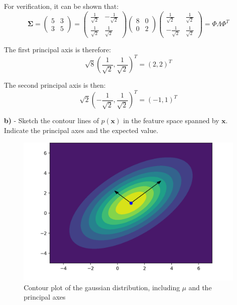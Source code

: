 \documentclass{homeworg}
\begin{document}
For verification, it can be shown that:
\begin{equation}
    \bm{\Sigma}
    =
    \begin{pmatrix}
        5&3 \\ 
        3&5
    \end{pmatrix}
    =
    \begin{pmatrix}
        \frac{1}{\sqrt{2}} & -\frac{1}{\sqrt{2}} \\
        \frac{1}{\sqrt{2}} & \frac{1}{\sqrt{2}}
    \end{pmatrix}
    \begin{pmatrix}
        8&0 \\ 
        0&2
    \end{pmatrix}
    \begin{pmatrix}
        \frac{1}{\sqrt{2}} & \frac{1}{\sqrt{2}} \\
        -\frac{1}{\sqrt{2}} & \frac{1}{\sqrt{2}}
    \end{pmatrix}
    =
    \Phi\Lambda\Phi^T
\end{equation}

The first principal axis is therefore:
\begin{equation}
    \sqrt{8}\left(\frac{1}{\sqrt{2}}, \frac{1}{\sqrt{2}}\right)^T = (2, 2)^T
\end{equation}

The second principal axis is then:
\begin{equation}
    \sqrt{2}\left(-\frac{1}{\sqrt{2}}, \frac{1}{\sqrt{2}}\right)^T = (-1, 1)^T
\end{equation}

\bigskip
\textbf{b)} - Sketch the contour lines of $p(\bm{x})$ in the feature space spanned by $\bm{x}$.
Indicate the principal axes and the expected value.
\smallskip

\begin{figure}[H]
    \centering
    \includegraphics[scale=0.9]{Figure2.png}
    \caption{Contour plot of the gaussian distribution, including $\mu$ and the principal axes}
\end{figure}
\end{document}
